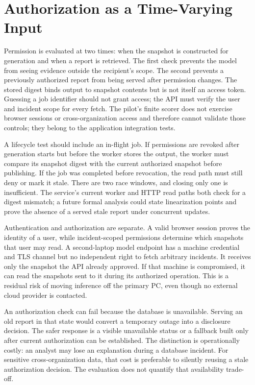 \section{Authorization as a Time-Varying Input}
Permission is evaluated at two times: when the snapshot is constructed for generation and when a report is retrieved. The first check prevents the model from seeing evidence outside the recipient's scope. The second prevents a previously authorized report from being served after permission changes. The stored digest binds output to snapshot contents but is not itself an access token. Guessing a job identifier should not grant access; the API must verify the user and incident scope for every fetch. The pilot's finite scorer does not exercise browser sessions or cross-organization access and therefore cannot validate those controls; they belong to the application integration tests.

A lifecycle test should include an in-flight job. If permissions are revoked after generation starts but before the worker stores the output, the worker must compare its snapshot digest with the current authorized snapshot before publishing. If the job was completed before revocation, the read path must still deny or mark it stale. There are two race windows, and closing only one is insufficient. The service's current worker and HTTP read paths both check for a digest mismatch; a future formal analysis could state linearization points and prove the absence of a served stale report under concurrent updates.

Authentication and authorization are separate. A valid browser session proves the identity of a user, while incident-scoped permissions determine which snapshots that user may read. A second-laptop model endpoint has a machine credential and TLS channel but no independent right to fetch arbitrary incidents. It receives only the snapshot the API already approved. If that machine is compromised, it can read the snapshots sent to it during its authorized operation. This is a residual risk of moving inference off the primary PC, even though no external cloud provider is contacted.

An authorization check can fail because the database is unavailable. Serving an old report in that state would convert a temporary outage into a disclosure decision. The safer response is a visible unavailable status or a fallback built only after current authorization can be established. The distinction is operationally costly: an analyst may lose an explanation during a database incident. For sensitive cross-organization data, that cost is preferable to silently reusing a stale authorization decision. The evaluation does not quantify that availability trade-off.

